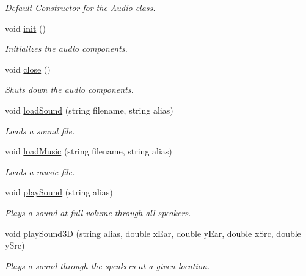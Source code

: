 \begin{CompactItemize}
\begin{CompactList}\small\item\em Default Constructor for the \hyperlink{class_audio}{Audio} class. \item\end{CompactList}\item 
void \hyperlink{class_audio_bd850ac47b52b4e43dfcbbc627162728}{init} ()
\begin{CompactList}\small\item\em Initializes the audio components. \item\end{CompactList}\item 
void \hyperlink{class_audio_8104ba39add67a27e07d16693e5b1569}{close} ()
\begin{CompactList}\small\item\em Shuts down the audio components. \item\end{CompactList}\item 
void \hyperlink{class_audio_5a9d44cfe20149b5266ec38c05b80134}{loadSound} (string filename, string alias)
\begin{CompactList}\small\item\em Loads a sound file. \item\end{CompactList}\item 
void \hyperlink{class_audio_3189dc36941d6049a6f106d9b9682bf8}{loadMusic} (string filename, string alias)
\begin{CompactList}\small\item\em Loads a music file. \item\end{CompactList}\item 
void \hyperlink{class_audio_92dbc4a10cc3246c2b9e64de945e8bb4}{playSound} (string alias)
\begin{CompactList}\small\item\em Plays a sound at full volume through all speakers. \item\end{CompactList}\item 
void \hyperlink{class_audio_6d08aba180fb15e764d1c983c1fbba4c}{playSound3D} (string alias, double xEar, double yEar, double xSrc, double ySrc)
\begin{CompactList}\small\item\em Plays a sound through the speakers at a given location. \item\end{CompactList}\item 

\end{CompactItemize}
